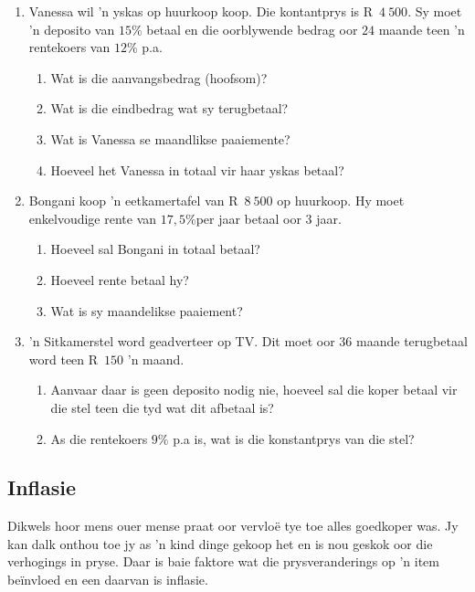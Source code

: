 \begin{exercises}{}
{
    \begin{enumerate}[label=\textbf{\arabic*}.]
	\item Vanessa wil 'n yskas op huurkoop koop. Die kontantprys is R~$4~500$. Sy moet 'n deposito van $15\%$ betaal en die oorblywende bedrag oor $24$ maande teen 'n rentekoers van $12\%$ p.a.
	\begin{enumerate}
	    \item Wat is die aanvangsbedrag (hoofsom)?
	    \item Wat is die eindbedrag wat sy terugbetaal?
	    \item Wat is Vanessa se maandlikse paaiemente?
	    \item Hoeveel het Vanessa in totaal vir haar yskas betaal?
	\end{enumerate}
	\item Bongani koop ’n eetkamertafel van R~$8~500$ op huurkoop. Hy moet enkelvoudige rente van $17,5\%$per jaar betaal oor 3 jaar.
	\begin{enumerate}
	    \item Hoeveel sal Bongani in totaal betaal?
	    \item Hoeveel rente betaal hy?
	    \item Wat is sy maandelikse paaiement?
	\end{enumerate}
	\item 'n Sitkamerstel word geadverteer op TV. Dit moet oor $36$ maande terugbetaal word teen R~$150$ 'n maand.
	\begin{enumerate}
	    \item Aanvaar daar is geen deposito nodig nie, hoeveel sal die koper betaal vir die stel teen die tyd wat dit afbetaal is?
	    \item As die rentekoers $9\%$ p.a is, wat is die konstantprys van die stel?\\
	\end{enumerate}
    \end{enumerate}

}
\end{exercises}




\subsection{Inflasie}

Dikwels hoor mens ouer mense praat oor vervlo\"e tye toe alles goedkoper was. Jy kan dalk onthou toe jy as 'n kind dinge gekoop het en is nou geskok oor die verhogings in pryse. Daar is baie faktore wat die prysveranderings op 'n item be\"invloed en een daarvan is inflasie.\par

